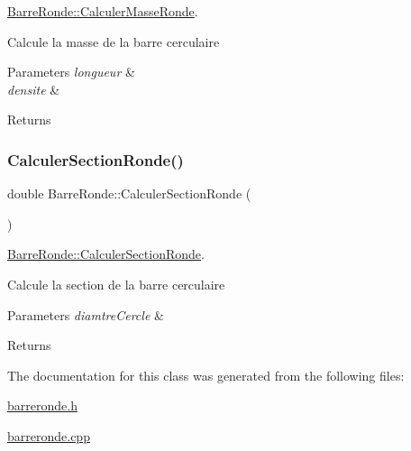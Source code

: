 \hyperlink{class_barre_ronde_a430f65888a5a7326c124b8181e5d99fc}{Barre\+Ronde\+::\+Calculer\+Masse\+Ronde}. 

Calcule la masse de la barre cerculaire 
\begin{DoxyParams}{Parameters}
{\em longueur} & \\
\hline
{\em densite} & \\
\hline
\end{DoxyParams}
\begin{DoxyReturn}{Returns}

\end{DoxyReturn}
\mbox{\label{class_barre_ronde_ad2d1bfff933bbd43891254a94f565ddc}} 
\subsubsection{\texorpdfstring{Calculer\+Section\+Ronde()}{CalculerSectionRonde()}}
{\footnotesize\ttfamily double Barre\+Ronde\+::\+Calculer\+Section\+Ronde (\begin{DoxyParamCaption}{ }\end{DoxyParamCaption})}



\hyperlink{class_barre_ronde_ad2d1bfff933bbd43891254a94f565ddc}{Barre\+Ronde\+::\+Calculer\+Section\+Ronde}. 

Calcule la section de la barre cerculaire 
\begin{DoxyParams}{Parameters}
{\em diamtre\+Cercle} & \\
\hline
\end{DoxyParams}
\begin{DoxyReturn}{Returns}

\end{DoxyReturn}


The documentation for this class was generated from the following files\+:\begin{DoxyCompactItemize}
\item 
\hyperlink{barreronde_8h}{barreronde.\+h}\item 
\hyperlink{barreronde_8cpp}{barreronde.\+cpp}\end{DoxyCompactItemize}
